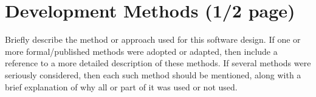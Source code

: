 \section{Development Methods (1/2 page)}
Briefly describe the method or approach used for this software design. If one or more formal/published methods were adopted or adapted, then include a reference to a more detailed description of these methods. If several methods were seriously considered, then each such method should be mentioned, along with a brief explanation of why all or part of it was used or not used.
